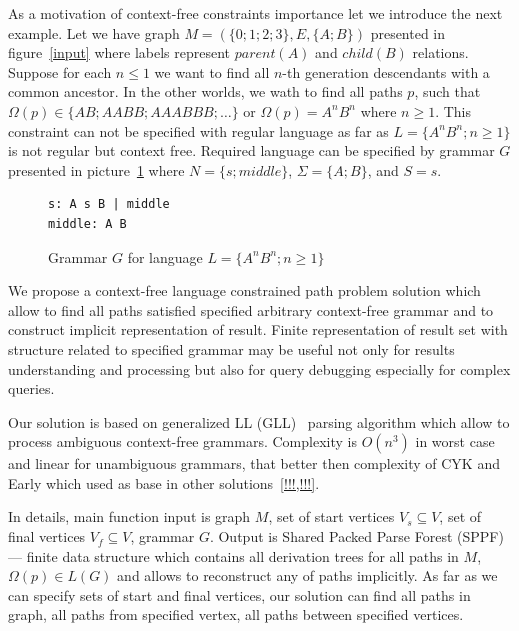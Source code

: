 \documentclass{sig-alternate} %
\begin{document}
As a motivation of context-free constraints importance let we introduce the next example.
Let we have graph $M=(\{0;1;2;3\},E,\{A;B\})$ presented in figure~\ref{input} where labels represent $parent (A)$ and $child (B)$ relations. 
Suppose for each $n \leq 1$ we want to find all $n$-th generation descendants with a common ancestor.
In the other worlds, we wath to find all paths $p$, such that $\Omega(p) \in \{AB; AABB; AAABBB; \dots\}$ or $\Omega(p) = A^n B^n$ where $n \geq 1$.
This constraint can not be specified with regular language as far as $L=\{A^n B^n; n \geq 1\}$ is not regular but context free.
Required language can be specified by grammar $G$ presented in picture~\ref{grammarG} where $N = \{s; middle\}$, $\Sigma = \{A; B\}$, and $S = s$.

\begin{figure}[h]
   \begin{center}
\begin{verbatim}
s: A s B | middle
middle: A B
\end{verbatim}
   \caption{Grammar $G$ for language $L=\{A^n B^n; n \geq 1\}$}
   \label{grammarG}        
   \end{center}
\end{figure}

We propose a context-free language constrained path problem solution which allow to find all paths satisfied specified arbitrary context-free grammar and to construct implicit representation of result. 
Finite representation of result set with structure related to specified grammar may be useful not only for results understanding and processing but also for query debugging especially for complex queries. 

Our solution is based on generalized LL (GLL)~\cite{GLL} parsing algorithm which allow to process ambiguous context-free grammars.
Complexity is $O(n^3)$ in worst case and linear for unambiguous grammars, that better then complexity of CYK and Early which used as base in other solutions~\ref{!!!,!!!}.

In details, main function input is graph $M$, set of start vertices $V_s\subseteq V$, set of final vertices $V_f\subseteq V$, grammar $G$.
Output is Shared Packed Parse Forest (SPPF) --- finite data structure which contains all derivation trees for all paths in $M$, $\Omega(p) \in L(G)$ and allows to reconstruct any of paths implicitly.
As far as we can specify sets of start and final vertices, our solution can find all paths in graph, all paths from specified vertex, all paths between specified vertices. 
\end{document}
